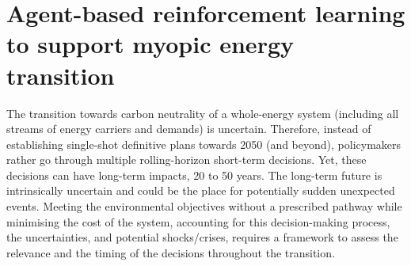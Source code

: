 \section{Agent-based reinforcement learning to support myopic energy transition}
\label{sec:meth:RL}

The transition towards carbon neutrality of a whole-energy system (\ie including all streams of energy carriers and demands) is uncertain. Therefore, instead of establishing single-shot definitive plans towards 2050 (and beyond), policymakers rather go through multiple rolling-horizon short-term decisions. Yet, these decisions can have long-term impacts, 20 to 50 years. The long-term future is intrinsically uncertain and could be the place for potentially sudden unexpected events. Meeting the environmental objectives without a prescribed  pathway while minimising the cost of the system, accounting for this decision-making process, the uncertainties, and potential shocks/crises, requires a framework to assess the relevance and the timing of the decisions throughout the transition. 

